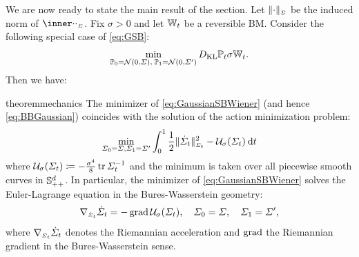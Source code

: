 We are now ready to state the main result of the section. Let $\normBW[\cdot][\Sigma]$ be the induced norm of $\innerBW[\cdot][\cdot][\Sigma]$. Fix $\sigma >0$ and let $\mathbb{W}_{t}$ be a {reversible} \acrlong{BM}. Consider the following special case of \eqref{eq:GSB}:%
\begin{equation}
\label{eq:GaussianSBWiener}
\min_{ \mathbb{P}_{{0}} = \mathcal{N}(0, \Sigma),\; \mathbb{P}_{{1}} = \mathcal{N}(0, \Sigma') } D_{\mathrm{KL}}{\mathbb{P}_{{t}}}{\sigma\mathbb{W}_{t}}.
\end{equation}
Then we have:
\begin{restatable}{theorem}{mechanics}
\label{thm:mechanics}
The minimizer of \eqref{eq:GaussianSBWiener} (and hence \eqref{eq:BBGaussian}) coincides with the solution of the action minimization problem:
\begin{align}
\label{eq:LagBW}
\min_{\Sigcurve[0] = \Sigma, \Sigma_\horizon = \Sigma'} \int_{0}^\horizon \LagBW \dt
\end{align}
where $\penergyBW \defeq - \frac{\sigma^4}{8} \tr \Sigcurveinv$ and the minimum is taken over all piecewise smooth curves in $\mathbb{S}_{++}^d$. In particular, the minimizer of \eqref{eq:GaussianSBWiener} solves the Euler-Lagrange equation in the Bures-Wasserstein geometry:
\begin{equation}
\label{eq:EL-BW}
\nabla_{\ssstyle\dSigcurve}\dSigcurve = -  \gradBW \penergyBW, \quad \Sigcurve[0] = \Sigma,\quad \Sigcurve[\horizon] = \Sigma',
\end{equation}
where $\nabla_{\scriptscriptstyle\dot{\Sigma}_{t}}\dot{\Sigma}_{t}$ denotes the Riemannian acceleration and $\operatorname{\mathrm{grad}}$ the Riemannian gradient in the Bures-Wasserstein sense.
\end{restatable}


